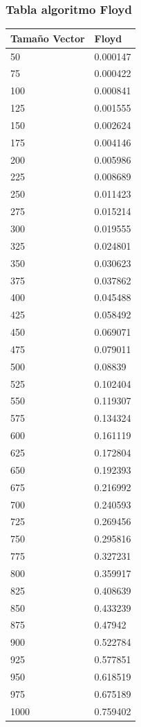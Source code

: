 \documentclass[a4paper, 11pt]{article}
\begin{document}
\subsubsection{Tabla algoritmo Floyd}
\begin{tabular}{@{}ll@{}}
\toprule
Tamaño Vector & Floyd    \\ \midrule
50            & 0.000147 \\
75            & 0.000422 \\
100           & 0.000841 \\
125           & 0.001555 \\
150           & 0.002624 \\
175           & 0.004146 \\
200           & 0.005986 \\
225           & 0.008689 \\
250           & 0.011423 \\
275           & 0.015214 \\
300           & 0.019555 \\
325           & 0.024801 \\
350           & 0.030623 \\
375           & 0.037862 \\
400           & 0.045488 \\
425           & 0.058492 \\
450           & 0.069071 \\
475           & 0.079011 \\
500           & 0.08839  \\
525           & 0.102404 \\
550           & 0.119307 \\
575           & 0.134324 \\
600           & 0.161119 \\
625           & 0.172804 \\
650           & 0.192393 \\
675           & 0.216992 \\
700           & 0.240593 \\
725           & 0.269456 \\
750           & 0.295816 \\
775           & 0.327231 \\
800           & 0.359917 \\
825           & 0.408639 \\
850           & 0.433239 \\
875           & 0.47942  \\
900           & 0.522784 \\
925           & 0.577851 \\
950           & 0.618519 \\
975           & 0.675189 \\
1000          & 0.759402 \\ \bottomrule
\end{tabular}
\end{document}
